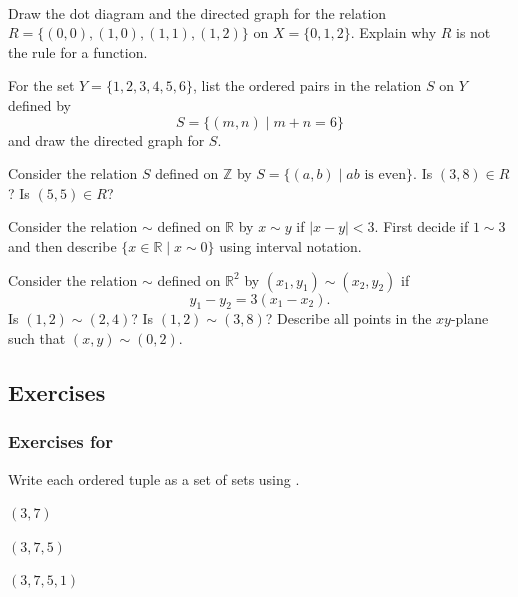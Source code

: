 \begin{act}[Relations]
\label{act_relations}
~
    \begin{apart}
        \item \label{part_first_relation} Draw the dot diagram and the directed graph for the relation $R=\{(0,0), (1,0), (1,1), (1,2)\}$ on $X=\{0,1,2\}$. Explain why $R$ is not the rule for a function.  
        
        \item For the set $Y = \{1,2,3,4,5,6\}$, list the ordered pairs in the relation $S$ on $Y$ defined by
            $$S = \{ (m,n) \mid m+n = 6 \}$$
        and draw the directed graph for $S$.
        
        \item Consider the relation $S$ defined on $\mathbb{Z}$ by $S=\{(a,b) \mid ab \text{ is even} \}.$ Is $(3,8) \in R$? Is $(5,5) \in R$?

        \item Consider the relation $\sim$ defined on $\mathbb{R}$ by $x \sim y$ if $|x - y | < 3$.  First decide if $1 \sim 3$ and then describe $\{x \in \mathbb{R} \mid x \sim 0\}$ using interval notation.

        \item Consider the relation $\sim$ defined on $\mathbb{R}^2$ by $(x_1,y_1) \sim (x_2,y_2)$ if $$y_1-y_2=3(x_1-x_2).$$  Is $(1,2) \sim (2,4)$? Is $(1,2) \sim (3,8)$?  Describe all points in the $xy$-plane such that $(x,y) \sim (0,2)$.
    \end{apart}
\end{act}


\subsection{Exercises}
    

\subsubsection*{Exercises for 
\subcartprod}

\begin{exer}[\exerP] %
\label{exer_ordered_tuple}
    Write each ordered tuple as a set of sets using .
        \begin{exerpart}
            \item $(3,7)$
            \item $(3,7,5)$
            \item $(3,7,5,1)$
        \end{exerpart}
\end{exer}

